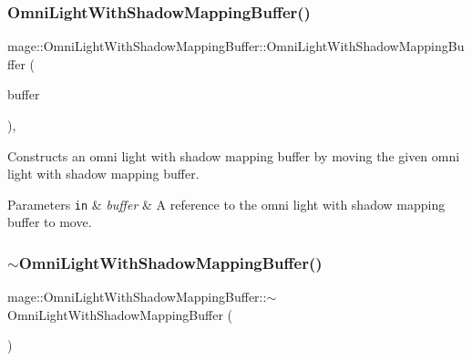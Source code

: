 \subsubsection{\texorpdfstring{Omni\+Light\+With\+Shadow\+Mapping\+Buffer()}{OmniLightWithShadowMappingBuffer()}\hspace{0.1cm}{\footnotesize\ttfamily [3/3]}}
{\footnotesize\ttfamily mage\+::\+Omni\+Light\+With\+Shadow\+Mapping\+Buffer\+::\+Omni\+Light\+With\+Shadow\+Mapping\+Buffer (\begin{DoxyParamCaption}\item[{\hyperlink{structmage_1_1_omni_light_with_shadow_mapping_buffer}{Omni\+Light\+With\+Shadow\+Mapping\+Buffer} \&\&}]{buffer }\end{DoxyParamCaption})\hspace{0.3cm}{\ttfamily [default]}, {\ttfamily [noexcept]}}

Constructs an omni light with shadow mapping buffer by moving the given omni light with shadow mapping buffer.


\begin{DoxyParams}[1]{Parameters}
\mbox{\tt in}  & {\em buffer} & A reference to the omni light with shadow mapping buffer to move. \\
\hline
\end{DoxyParams}
\hypertarget{structmage_1_1_omni_light_with_shadow_mapping_buffer_ac28ea25ecb8f27be2403c37a16fd9631}{}\label{structmage_1_1_omni_light_with_shadow_mapping_buffer_ac28ea25ecb8f27be2403c37a16fd9631} 
\subsubsection{\texorpdfstring{$\sim$\+Omni\+Light\+With\+Shadow\+Mapping\+Buffer()}{~OmniLightWithShadowMappingBuffer()}}
{\footnotesize\ttfamily mage\+::\+Omni\+Light\+With\+Shadow\+Mapping\+Buffer\+::$\sim$\+Omni\+Light\+With\+Shadow\+Mapping\+Buffer (\begin{DoxyParamCaption}{ }\end{DoxyParamCaption})\hspace{0.3cm}{\ttfamily [default]}}

